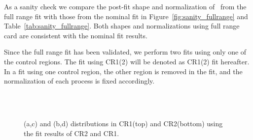 As a sanity check we compare the post-fit shape and normalization of \qqww\
from the full range fit with those from the nominal fit in 
Figure~\ref{fig:sanity_fullrange} and Table~\ref{tab:sanity_fullrange}. 
Both shapes and normalizations using full range card 
are consistent with the nominal fit results. 

Since the full range fit has been validated, 
we perform two fits using only one of the control regions.
The fit using CR1(2) will be denoted as CR1(2) fit hereafter. 
In a fit using one control region, 
the other region is removed in the fit, and the normalization of each process 
is fixed accordingly. 

\begin{figure}[!hbtp]
\centering
{}
\\
\\
\caption{\mll(a,c) and \mT(b,d) distributions in CR1(top) and CR2(bottom) 
using the fit results of CR2 and CR1.}
\label{fig:wwctl_final}
\end{figure}

